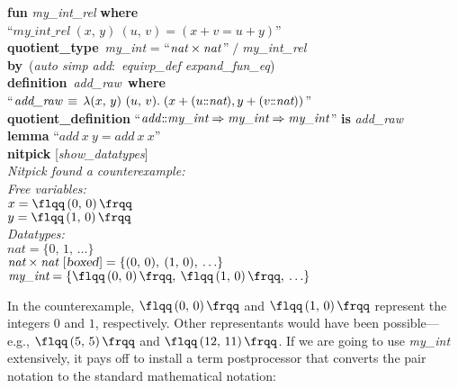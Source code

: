 \documentclass[a4paper,12pt]{article}
\def\Colon{\mathord{:\mkern-1.5mu:}}
\def\unr{\ldots}
\def\Abs#1{\hbox{\rm{\flqq}}{\,#1\,}\hbox{\rm{\frqq}}}
\begin{document}
\prew
\textbf{fun} \textit{my\_int\_rel} \textbf{where} \\
``$\textit{my\_int\_rel}~(x,\, y)~(u,\, v) = (x + v = u + y)$'' \\[2\smallskipamount]
%
\textbf{quotient\_type}~\textit{my\_int} = ``$\textit{nat} \times \textit{nat\/}$''$\;{/}\;$\textit{my\_int\_rel} \\
\textbf{by}~(\textit{auto simp add\/}:\ \textit{equivp\_def expand\_fun\_eq}) \\[2\smallskipamount]
%
\textbf{definition}~\textit{add\_raw}~\textbf{where} \\
``$\textit{add\_raw} \,\equiv\, \lambda(x,\, y)~(u,\, v).\; (x + (u\Colon\textit{nat}), y + (v\Colon\textit{nat}))$'' \\[2\smallskipamount]
%
\textbf{quotient\_definition} ``$\textit{add\/}\Colon\textit{my\_int} \Rightarrow \textit{my\_int} \Rightarrow \textit{my\_int\/}$'' \textbf{is} \textit{add\_raw} \\[2\smallskipamount]
%
\textbf{lemma} ``$\textit{add}~x~y = \textit{add}~x~x$'' \\
\textbf{nitpick} [\textit{show\_datatypes}] \\[2\smallskipamount]
\slshape Nitpick found a counterexample: \\[2\smallskipamount]
\hbox{}\qquad Free variables: \nopagebreak \\
\hbox{}\qquad\qquad $x = \Abs{(0,\, 0)}$ \\
\hbox{}\qquad\qquad $y = \Abs{(1,\, 0)}$ \\
\hbox{}\qquad Datatypes: \\
\hbox{}\qquad\qquad $\textit{nat} = \{0,\, 1,\, \unr\}$ \\
\hbox{}\qquad\qquad $\textit{nat} \times \textit{nat}~[\textsl{boxed\/}] = \{(0,\, 0),\> (1,\, 0),\> \unr\}$ \\
\hbox{}\qquad\qquad $\textit{my\_int} = \{\Abs{(0,\, 0)},\> \Abs{(1,\, 0)},\> \unr\}$
\postw

In the counterexample, $\Abs{(0,\, 0)}$ and $\Abs{(1,\, 0)}$ represent the
integers $0$ and $1$, respectively. Other representants would have been
possible---e.g., $\Abs{(5,\, 5)}$ and $\Abs{(12,\, 11)}$. If we are going to
use \textit{my\_int} extensively, it pays off to install a term postprocessor
that converts the pair notation to the standard mathematical notation:
\end{document}

